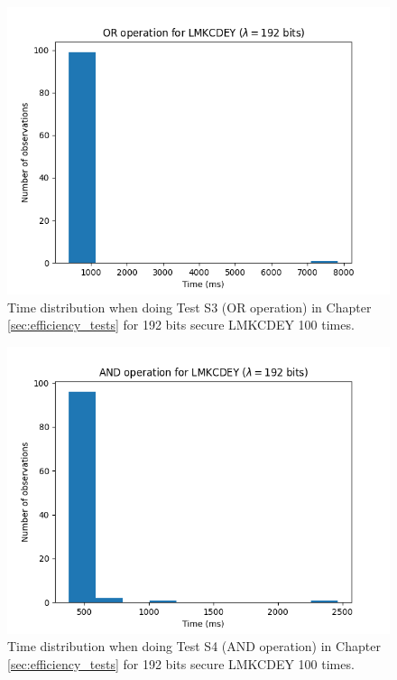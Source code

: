 \begin{figure}[ht]
    \centering
    \includegraphics[width=0.8\linewidth]{data/figures/LMKCDEY_STD192_OR_operation.png}
    \caption{Time distribution when doing Test S3 (OR operation) in Chapter \ref{sec:efficiency_tests} for 192 bits secure LMKCDEY 100 times.}
    \label{fig:distr_lmkcdey192_or}
\end{figure}

\begin{figure}[ht]
    \centering
    \includegraphics[width=0.8\linewidth]{data/figures/LMKCDEY_STD192_AND_operation.png}
    \caption{Time distribution when doing Test S4 (AND operation) in Chapter \ref{sec:efficiency_tests} for 192 bits secure LMKCDEY 100 times.}
    \label{fig:distr_lmkcdey192_and}
\end{figure}

